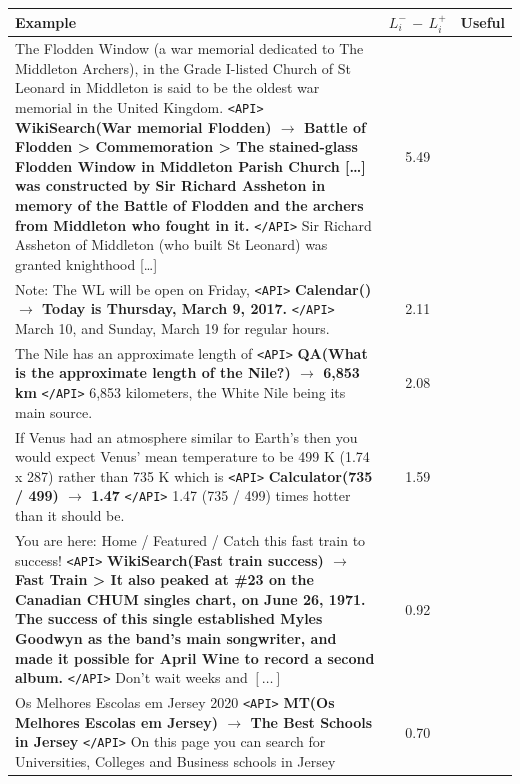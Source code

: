 \documentclass[11pt]{article}
\newcommand{\cmark}{\ding{51}}%
\newcommand{\xmark}{\ding{55}}%
\begin{document}
\begin{CJK*}{UTF8}{gbsn}
\begin{table}[ht]
    \renewcommand\tabularxcolumn[1]{m{#1}}%
    \centering
    \small
    \begin{tabularx}{\linewidth}{Xcc}
    \toprule
    \textbf{Example} & $L_i^-\,{-}\,L_i^+$ & \textbf{Useful}  \\
    \midrule
    The Flodden Window (a war memorial dedicated to The Middleton Archers), in the Grade I-listed Church of St Leonard in Middleton is said to be the oldest war memorial in the United Kingdom. \texttt{<API>} \textbf{WikiSearch(War memorial Flodden) $\rightarrow$ Battle of Flodden > Commemoration > The stained-glass Flodden Window in Middleton Parish Church [\ldots] was constructed by Sir Richard Assheton in memory of the Battle of Flodden and the archers from Middleton who fought in it.} \texttt{</API>} Sir Richard Assheton of Middleton (who built St Leonard) was granted knighthood [\ldots] & 5.49 & \cmark \\
    \midrule
    Note: The WL will be open on Friday, \texttt{<API>} \textbf{Calendar() $\rightarrow$ Today is Thursday, March 9, 2017.} \texttt{</API>} March 10, and Sunday, March 19 for regular hours. & 2.11 & \cmark \\   
    \midrule
    The Nile has an approximate length of \texttt{<API>} \textbf{QA(What is the approximate length of the Nile?) $\rightarrow$ 6,853 km} \texttt{</API>} 6,853 kilometers, the White Nile being its main source. & 2.08 & \cmark \\
    \midrule
    If Venus had an atmosphere similar to Earth's then you would expect Venus' mean temperature to be 499 K (1.74 x 287) rather than 735 K which is \texttt{<API>} \textbf{Calculator(735 / 499) $\rightarrow$ 1.47} \texttt{</API>} 1.47 (735 / 499) times hotter than it should be. & 1.59 & \cmark \\
    \midrule
    You are here: Home / Featured / Catch this fast train to success! \texttt{<API>} \textbf{WikiSearch(Fast train success) $\rightarrow$ Fast Train > It also peaked at \#23 on the Canadian CHUM singles chart, on June 26, 1971. The success of this single established Myles Goodwyn as the band's main songwriter, and made it possible for April Wine to record a second album.} \texttt{</API>} Don’t wait weeks and $\left[\ldots\right]$ & 0.92 & \xmark \\
    \midrule
    Os Melhores Escolas em Jersey 2020 \texttt{<API>} \textbf{MT(Os Melhores Escolas em Jersey) $\rightarrow$ The Best Schools in Jersey} \texttt{</API>} On this page you can search for Universities, Colleges and Business schools in Jersey &  0.70 & \cmark \\

\end{tabularx}
\end{table}
\end{CJK*}
\end{document}
